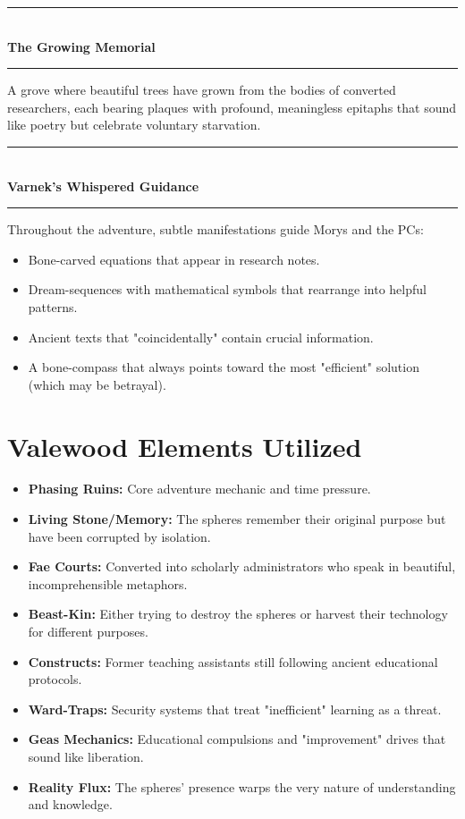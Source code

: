 \documentclass[11pt,twoside]{book}
\newcommand{\setpiece}[1]{%
  \needspace{4\baselineskip}%
  \begin{center}
    \rule{\textwidth}{1pt}\\
    \textbf{\sffamily\Large #1}\\
    \rule{\textwidth}{1pt}
  \end{center}
}
\begin{document}
\setpiece{The Growing Memorial}
A grove where beautiful trees have grown from the bodies of converted researchers, each bearing plaques with profound, meaningless epitaphs that sound like poetry but celebrate voluntary starvation.

\setpiece{Varnek's Whispered Guidance}
Throughout the adventure, subtle manifestations guide Morys and the PCs:
\begin{itemize}
    \item Bone-carved equations that appear in research notes.
    \item Dream-sequences with mathematical symbols that rearrange into helpful patterns.
    \item Ancient texts that "coincidentally" contain crucial information.
    \item A bone-compass that always points toward the most "efficient" solution (which may be betrayal).
\end{itemize}

\chapter{Valewood Elements Utilized}

\begin{itemize}
    \item \textbf{Phasing Ruins:} Core adventure mechanic and time pressure.
    \item \textbf{Living Stone/Memory:} The spheres remember their original purpose but have been corrupted by isolation.
    \item \textbf{Fae Courts:} Converted into scholarly administrators who speak in beautiful, incomprehensible metaphors.
    \item \textbf{Beast-Kin:} Either trying to destroy the spheres or harvest their technology for different purposes.
    \item \textbf{Constructs:} Former teaching assistants still following ancient educational protocols.
    \item \textbf{Ward-Traps:} Security systems that treat "inefficient" learning as a threat.
    \item \textbf{Geas Mechanics:} Educational compulsions and "improvement" drives that sound like liberation.
    \item \textbf{Reality Flux:} The spheres' presence warps the very nature of understanding and knowledge.
\end{itemize}
\end{document}
